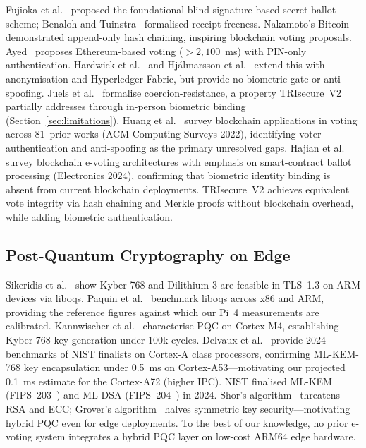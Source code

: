 \documentclass[conference]{IEEEtran}
\begin{document}
Fujioka et al.~\cite{fujioka1992practical} proposed the foundational
blind-signature-based secret ballot scheme; Benaloh and
Tuinstra~\cite{benaloh1994receipt} formalised receipt-freeness.
Nakamoto's Bitcoin~\cite{nakamoto2008bitcoin} demonstrated append-only hash
chaining, inspiring blockchain voting proposals.
Ayed~\cite{ayed2017conceptual} proposes Ethereum-based voting
(\(>2{,}100\)~ms) with PIN-only authentication.
Hardwick et al.~\cite{hardwick2018voting} and Hj\'{a}lmarsson et
al.~\cite{hjalmarsson2018blockchain} extend this with anonymisation and
Hyperledger Fabric, but provide no biometric gate or anti-spoofing.
Juels et al.~\cite{juels2010coercion} formalise coercion-resistance,
a property TRIsecure~V2 partially addresses through in-person biometric
binding (Section~\ref{sec:limitations}).
Huang et al.~\cite{huang2022blockchain_voting} survey blockchain applications
in voting across 81~prior works (ACM Computing Surveys 2022), identifying
voter authentication and anti-spoofing as the primary unresolved gaps.
Hajian et al.~\cite{hajian2024blockchain} survey blockchain e-voting
architectures with emphasis on smart-contract ballot processing
(Electronics 2024), confirming that biometric identity binding is absent
from current blockchain deployments.
TRIsecure~V2 achieves equivalent vote integrity via hash chaining and Merkle
proofs without blockchain overhead, while adding biometric authentication.

\subsection{Post-Quantum Cryptography on Edge}

Sikeridis et al.~\cite{sikeridis2020pqc} show Kyber-768 and Dilithium-3 are
feasible in TLS~1.3 on ARM devices via liboqs.
Paquin et al.~\cite{paquin2019oqs} benchmark liboqs across x86 and ARM,
providing the reference figures against which our Pi~4 measurements are
calibrated. Kannwischer et al.~\cite{kannwischer2019pqm4} characterise PQC
on Cortex-M4, establishing Kyber-768 key generation under 100k cycles.
Delvaux et al.~\cite{delvaux2024pqc_iot} provide 2024 benchmarks of NIST
finalists on Cortex-A class processors, confirming ML-KEM-768 key
encapsulation under 0.5~ms on Cortex-A53—motivating our projected 0.1~ms
estimate for the Cortex-A72 (higher IPC).
NIST finalised ML-KEM (FIPS~203~\cite{nist_fips203}) and ML-DSA
(FIPS~204~\cite{nist_fips204}) in 2024. Shor's algorithm~\cite{shor1994algorithms}
threatens RSA and ECC; Grover's algorithm~\cite{grover1996fast} halves symmetric
key security—motivating hybrid PQC even for edge deployments. To the best of our knowledge, no prior e-voting system integrates a
hybrid PQC layer on low-cost ARM64 edge hardware.
\end{document}
